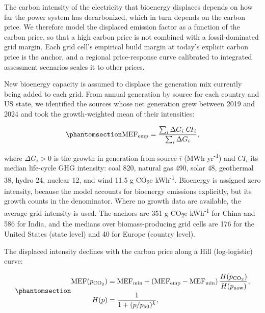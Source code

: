 \documentclass[
  letterpaper,
  twoside,
  twocolumn,
  9pt]{article}
\begin{document}
The carbon intensity of the electricity that bioenergy displaces depends
on how far the power system has decarbonized, which in turn depends on
the carbon price. We therefore model the displaced emission factor as a
function of the carbon price, so that a high carbon price is not
combined with a fossil-dominated grid margin. Each grid cell's empirical
build margin at today's explicit carbon price is the anchor, and a
regional price-response curve calibrated to integrated assessment
scenarios scales it to other prices.

New bioenergy capacity is assumed to displace the generation mix
currently being added to each grid. From annual generation by source for
each country and US state,\citep{ember2026yearly, ember2026us} we
identified the sources whose net generation grew between 2019 and 2024
and took the growth-weighted mean of their intensities:

\begin{equation}\phantomsection\label{eq-mef-emp}{\mathrm{MEF}_{\mathrm{emp}} = \frac{\sum_i \Delta G_i\, \mathit{CI}_i}{\sum_i \Delta G_i},}\end{equation}

where \(\Delta G_i > 0\) is the growth in generation from source \(i\)
(MWh yr\textsuperscript{-1}) and \(\mathit{CI}_i\) its median life-cycle
GHG intensity:\citep{schlomer2014} coal 820, natural gas 490, solar 48,
geothermal 38, hydro 24, nuclear 12, and wind 11.5 g
CO\textsubscript{2}e kWh\textsuperscript{-1}. Bioenergy is assigned zero
intensity, because the model accounts for bioenergy emissions
explicitly, but its growth counts in the denominator. Where no growth
data are available, the average grid intensity is used. The anchors are
351 g CO\textsubscript{2}e kWh\textsuperscript{-1} for China and 586 for
India, and the medians over biomass-producing grid cells are 176 for the
United States (state level) and 40 for Europe (country level).

The displaced intensity declines with the carbon price along a Hill
(log-logistic) curve:

\begin{equation}\phantomsection\label{eq-mef}{\begin{aligned}
\mathrm{MEF}(p_{\mathrm{CO_2}}) &= \mathrm{MEF}_{\mathrm{min}} + \left(\mathrm{MEF}_{\mathrm{emp}} - \mathrm{MEF}_{\mathrm{min}}\right) \frac{H(p_{\mathrm{CO_2}})}{H(p_{\mathrm{now}})}, \\
H(p) &= \frac{1}{1 + (p/p_{50})^{k}},
\end{aligned}}\end{equation}
\end{document}
